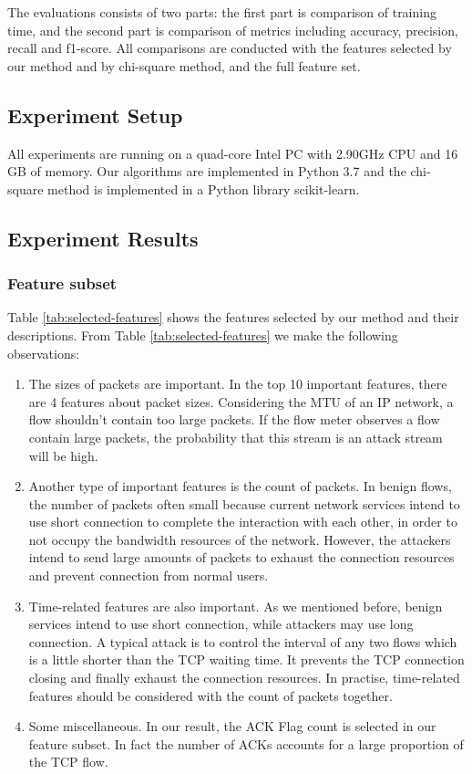 \documentclass[journal]{IEEEtran}
\begin{document}
The evaluations consists of two parts: the first part is comparison of training time, and the second part is comparison of metrics including accuracy, precision, recall and f1-score. All comparisons are conducted with the features selected by our method and by chi-square method, and the full feature set.

\subsection{Experiment Setup}

All experiments are running on a quad-core Intel PC with 2.90GHz CPU and 16 GB of memory. Our algorithms are implemented in Python 3.7 and the chi-square method is implemented in a Python library scikit-learn\cite{sklearn}.

\subsection{Experiment Results}

\subsubsection{Feature subset}

Table \ref{tab:selected-features} shows the features selected by our method and their descriptions. From Table \ref{tab:selected-features} we make the following observations:

\begin{enumerate}
	\item The sizes of packets are important. In the top 10 important features, there are 4 features about packet sizes. Considering the MTU of an IP network, a flow shouldn’t contain too large packets. If the flow meter observes a flow contain large packets, the probability that this stream is an attack stream will be high. 
    \item Another type of important features is the count of packets. In benign flows, the number of packets often small because current network services intend to use short connection to complete the interaction with each other, in order to not occupy the bandwidth resources of the network. However, the attackers intend to send large amounts of packets to exhaust the connection resources and prevent connection from normal users. 
    \item Time-related features are also important. As we mentioned before, benign services intend to use short connection, while attackers may use long connection. A typical attack is to control the interval of any two flows which is a little shorter than the TCP waiting time. It prevents the TCP connection closing and finally exhaust the connection resources. In practise, time-related features should be considered with the count of packets together.
    \item Some miscellaneous. In our result, the ACK Flag count is selected in our feature subset. In fact the number of ACKs accounts for a large proportion of the TCP flow. %
\end{enumerate} 
\end{document}
